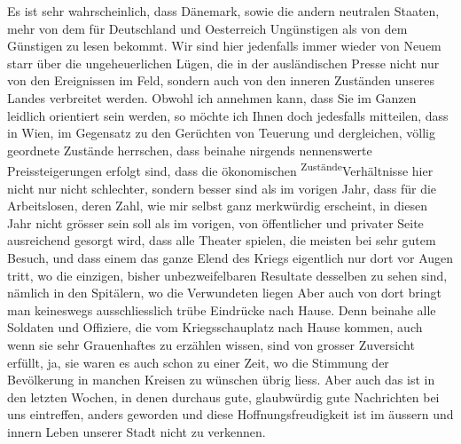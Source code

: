 \pstart
           Es ist sehr wahrscheinlich, dass {\pb}Dänemark, sowie die andern neutralen Staaten,
               mehr von dem für Deutschland und Oesterreich Ungünstigen als von dem Günstigen zu
               lesen bekommt. Wir sind hier jedenfalls immer wieder von Neuem starr über die
               ungeheuerlichen Lügen, die in der ausländischen Presse nicht nur von den Ereignissen
               im Feld, sondern auch von den inneren Zuständen unseres Landes verbreitet werden.
               Obwohl ich annehmen kann, dass Sie im Ganzen \label{LL710-1v}\label{LL710-1h}leidlich orientiert sein werden, so möchte ich Ihnen doch jedesfalls mitteilen,
               dass in Wien, im Gegensatz zu den Gerüchten von
               Teuerung und dergleichen, völlig geordnete Zustände herrschen, dass beinahe nirgends
               nennenswerte Preissteigerungen erfolgt sind, dass die ökonomischen \substVorne{}\textsuperscript{Zustände}\substDazwischen{}Verhältnisse\substHinten{} hier nicht nur nicht schlechter, sondern besser sind als im vorigen Jahr,
               dass für die Arbeitslosen, deren Zahl, wie mir selbst ganz merkwürdig erscheint, in
               diesen Jahr nicht grösser sein soll als im vorigen, von öffentlicher und privater
               Seite ausreichend {\pb}gesorgt wird, dass alle Theater
               spielen, die meisten bei sehr gutem Besuch, und dass einem das ganze Elend des Kriegs
               eigentlich nur dort vor Augen tritt, wo die einzigen, bisher unbezweifelbaren
               Resultate desselben zu sehen sind, nämlich in den Spitälern, wo die Verwundeten
                  liegen{\dotstwo} Aber auch von dort bringt man keineswegs
               ausschliesslich trübe Eindrücke nach Hause. Denn beinahe alle Soldaten und Offiziere,
               die vom Kriegsschauplatz nach Hause kommen, auch wenn sie sehr Grauenhaftes zu
               erzählen wissen, sind von grosser Zuversicht erfüllt, ja, sie waren es auch schon zu
               einer Zeit, wo die Stimmung der Bevölkerung in manchen Kreisen zu wünschen übrig
               liess. Aber auch das ist in den letzten Wochen, in denen durchaus gute, glaubwürdig
               gute Nachrichten bei uns eintreffen, anders geworden und diese Hoffnungsfreudigkeit
               ist im äussern und innern Leben unserer Stadt nicht zu verkennen.\pend
           
